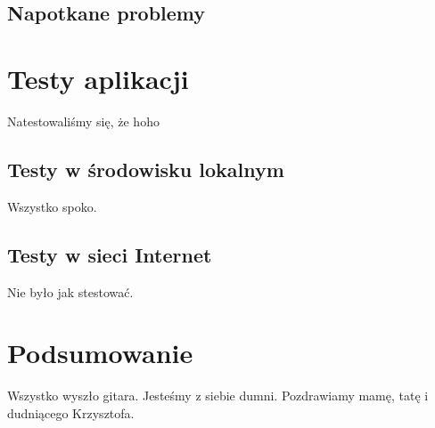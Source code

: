 \documentclass[polish]{inz}
\begin{document}
\section{Napotkane problemy}


\chapter{Testy aplikacji}
Natestowaliśmy się, że hoho

\section{Testy w środowisku lokalnym}
Wszystko spoko.

\section{Testy w sieci Internet}
Nie było jak stestować.

\chapter{Podsumowanie}
Wszystko wyszło gitara. Jesteśmy z siebie dumni. Pozdrawiamy mamę, tatę i dudniącego Krzysztofa.

\printindex
\end{document}
